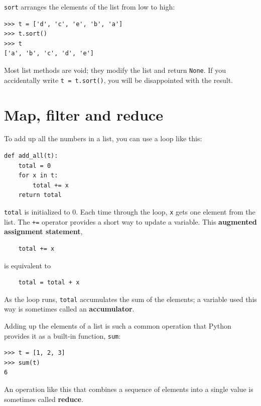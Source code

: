 \documentclass[10pt]{book}
\begin{document}
{\tt sort} arranges the elements of the list from low to high:

\begin{verbatim}
>>> t = ['d', 'c', 'e', 'b', 'a']
>>> t.sort()
>>> t
['a', 'b', 'c', 'd', 'e']
\end{verbatim}
%
Most list methods are void; they modify the list and return {\tt None}.
If you accidentally write {\tt t = t.sort()}, you will be disappointed
with the result.


\section{Map, filter and reduce}
\label{filter}

To add up all the numbers in a list, you can use a loop like this:


\begin{verbatim}
def add_all(t):
    total = 0
    for x in t:
        total += x
    return total
\end{verbatim}
%
{\tt total} is initialized to 0.  Each time through the loop,
{\tt x} gets one element from the list.  The {\tt +=} operator
provides a short way to update a variable.  This
{\bf augmented assignment statement},

\begin{verbatim}
    total += x
\end{verbatim}
%
is equivalent to

\begin{verbatim}
    total = total + x
\end{verbatim}
%
As the loop runs, {\tt total} accumulates the sum of the
elements; a variable used this way is sometimes called an
{\bf accumulator}.

Adding up the elements of a list is such a common operation
that Python provides it as a built-in function, {\tt sum}:

\begin{verbatim}
>>> t = [1, 2, 3]
>>> sum(t)
6
\end{verbatim}
%
An operation like this that combines a sequence of elements into
a single value is sometimes called {\bf reduce}.
\end{document}
